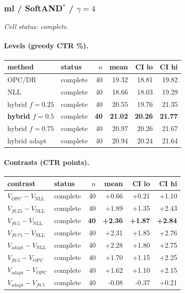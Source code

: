\documentclass[10pt,a4paper]{article}
\begin{document}
\subsubsection{ml / SoftAND$^*$ / $\gamma=4$}
\emph{Cell status: complete}.
\paragraph{Levels (greedy CTR \%).}
{\centering\small\begin{tabular}{llrrrr}
\toprule method & status & $n$ & mean & CI lo & CI hi \\
\midrule
OPC/DR & complete & 40 & 19.32 & 18.81 & 19.82 \\
NLL & complete & 40 & 18.66 & 18.03 & 19.29 \\
hybrid $f{=}0.25$ & complete & 40 & 20.55 & 19.76 & 21.35 \\
\textbf{hybrid $f{=}0.5$} & complete & \textbf{40} & \textbf{21.02} & \textbf{20.26} & \textbf{21.77} \\
hybrid $f{=}0.75$ & complete & 40 & 20.97 & 20.26 & 21.67 \\
hybrid adapt & complete & 40 & 20.94 & 20.24 & 21.64 \\
\bottomrule\end{tabular}\par}
\paragraph{Contrasts (CTR points).}
{\centering\small\begin{tabular}{llrrrr}
\toprule contrast & status & $n$ & mean & CI lo & CI hi \\
\midrule
$V_{\mathrm{OPC}}-V_{\mathrm{NLL}}$ & complete & 40 & +0.66 & +0.21 & +1.10 \\
$V_{f0.25}-V_{\mathrm{NLL}}$ & complete & 40 & +1.89 & +1.35 & +2.43 \\
\textbf{$V_{f0.5}-V_{\mathrm{NLL}}$} & complete & \textbf{40} & \textbf{+2.36} & \textbf{+1.87} & \textbf{+2.84} \\
$V_{f0.75}-V_{\mathrm{NLL}}$ & complete & 40 & +2.31 & +1.85 & +2.76 \\
$V_{\mathrm{adapt}}-V_{\mathrm{NLL}}$ & complete & 40 & +2.28 & +1.80 & +2.75 \\
$V_{f0.5}-V_{\mathrm{OPC}}$ & complete & 40 & +1.70 & +1.15 & +2.25 \\
$V_{\mathrm{adapt}}-V_{\mathrm{OPC}}$ & complete & 40 & +1.62 & +1.10 & +2.15 \\
$V_{\mathrm{adapt}}-V_{f0.5}$ & complete & 40 & -0.08 & -0.37 & +0.21 \\
\bottomrule\end{tabular}\par}
\end{document}
